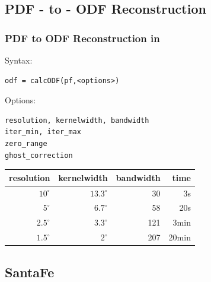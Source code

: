 \begin{frame}[fragile]
\begin{columns}
\begin{column}{3.1cm}
{      }
    \end{column}

  \end{columns}

\end{frame}

\subsection*{PDF - to - ODF Reconstruction}


\begin{frame}[fragile]
  \frametitle{PDF to ODF Reconstruction in \MTEX}

  Syntax:
  \begin{alertenv}
\begin{lstlisting}
odf = calcODF(pf,<options>)
\end{lstlisting}
  \end{alertenv}

Options:
\begin{lstlisting}
resolution, kernelwidth, bandwidth
iter_min, iter_max
zero_range
ghost_correction
\end{lstlisting}

\pause

\begin{table}[H]
  \centering
  \begin{tabular}{r r r r}
    \toprule
    resolution & kernelwidth  & bandwidth & time \\
    \midrule
    $10^\circ$  & $13.3^\circ$ & 30  & 3s  \\
    $5^\circ$   & $6.7^\circ$  & 58  & 20s \\
    $2.5^\circ$ & $3.3^\circ$  & 121 & 3min\\
    $1.5^\circ$ & $2^\circ$    & 207 & 20min\\
    \bottomrule
  \end{tabular}
\end{table}

\end{frame}


\subsection*{SantaFe}

